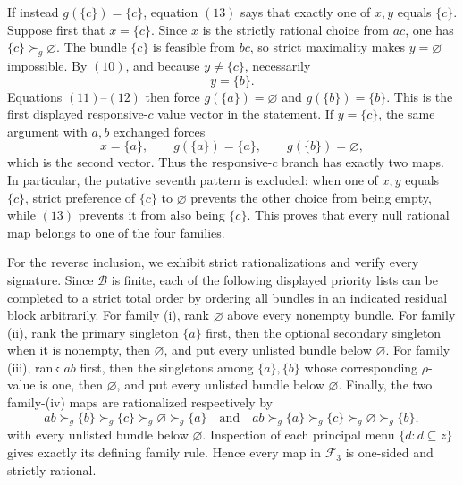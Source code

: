 If instead \(g(\{c\})=\{c\}\), equation \((13)\) says that exactly
one of \(x,y\) equals \(\{c\}\).  Suppose first that
\(x=\{c\}\).  Since \(x\) is the strictly rational choice from
\(ac\), one has \(\{c\}\succ_g\varnothing\).  The bundle
\(\{c\}\) is feasible from \(bc\), so strict maximality makes
\(y=\varnothing\) impossible.  By \((10)\), and because
\(y\ne\{c\}\), necessarily
\[
y=\{b\}. \tag{15}
\]
Equations \((11)\)--\((12)\) then force
\(g(\{a\})=\varnothing\) and \(g(\{b\})=\{b\}\).  This is the
first displayed responsive-\(c\) value vector in the statement.  If
\(y=\{c\}\), the same argument with \(a,b\) exchanged forces
\[
x=\{a\},
\qquad
g(\{a\})=\{a\},
\qquad
g(\{b\})=\varnothing, \tag{16}
\]
which is the second vector.  Thus the responsive-\(c\) branch has
exactly two maps.  In particular, the putative seventh pattern is
excluded: when one of \(x,y\) equals \(\{c\}\), strict preference of
\(\{c\}\) to \(\varnothing\) prevents the other choice from being
empty, while \((13)\) prevents it from also being \(\{c\}\).
This proves that every null rational map belongs to one of the four
families.

For the reverse inclusion, we exhibit strict rationalizations and
verify every signature.  Since \(\mathcal B\) is finite, each of the
following displayed priority lists can be completed to a strict total
order by ordering all bundles in an indicated residual block
arbitrarily.  For family (i), rank \(\varnothing\) above every
nonempty bundle.  For family (ii), rank the primary singleton
\(\{a\}\) first, then the optional secondary singleton when it is
nonempty, then \(\varnothing\), and put every unlisted bundle below
\(\varnothing\).  For family (iii), rank \(ab\) first, then the
singletons among \(\{a\},\{b\}\) whose corresponding
\(\rho\)-value is one, then \(\varnothing\), and put every unlisted
bundle below \(\varnothing\).  Finally, the two family-(iv) maps are
rationalized respectively by
\[
ab\succ_g\{b\}\succ_g\{c\}\succ_g\varnothing\succ_g\{a\}
\quad\text{and}\quad
ab\succ_g\{a\}\succ_g\{c\}\succ_g\varnothing\succ_g\{b\},
\tag{17}
\]
with every unlisted bundle below \(\varnothing\).  Inspection of each
principal menu \(\{d:d\subseteq z\}\) gives exactly its defining
family rule.  Hence every map in \(\mathcal F_3\) is one-sided and
strictly rational.

